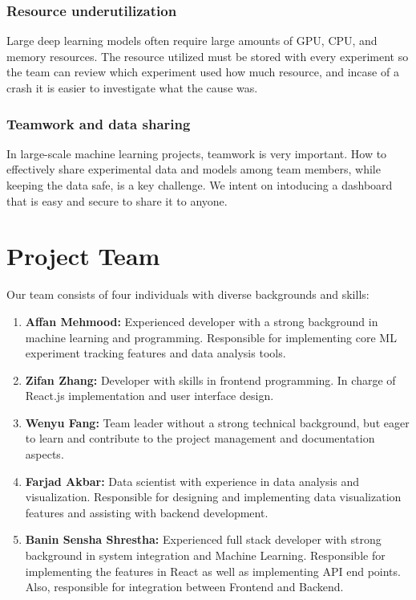 \documentclass[12pt]{article}
\begin{document}
\subsubsection{Resource underutilization}
Large deep learning models often require large amounts of GPU, CPU, and memory resources. The resource utilized must be stored with every experiment so the team can review which experiment used how much resource, and incase of a crash it is easier to investigate what the cause was.
\subsubsection{Teamwork and data sharing}
In large-scale machine learning projects, teamwork is very important. How to effectively share experimental data and models among team members, while keeping the data safe, is a key challenge. We intent on intoducing a dashboard that is easy and secure to share it to anyone.
\section{Project Team}

Our team consists of four individuals with diverse backgrounds and skills:

\begin{enumerate}
    \item \textbf{Affan Mehmood:} Experienced developer with a strong background in machine learning and programming. Responsible for implementing core ML experiment tracking features and data analysis tools.
    
    \item \textbf{Zifan Zhang:} Developer with skills in frontend programming. In charge of React.js implementation and user interface design.
    
    \item \textbf{Wenyu Fang:} Team leader without a strong technical background, but eager to learn and contribute to the project management and documentation aspects.
    
    \item \textbf{Farjad Akbar:} Data scientist with experience in data analysis and visualization. Responsible for designing and implementing data visualization features and assisting with backend development.

    \item \textbf{Banin Sensha Shrestha:} Experienced full stack developer with strong background in system integration and Machine Learning. Responsible for implementing the features in React as well as implementing API end points. Also, responsible for integration between Frontend and Backend.
\end{enumerate}
\end{document}
